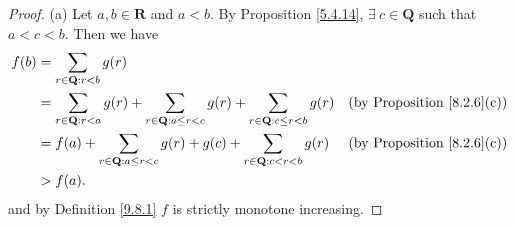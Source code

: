 \begin{proof}{(a)}
    Let \(a, b \in \mathbf{R}\) and \(a < b\).
    By Proposition \ref{5.4.14}, \(\exists\ c \in \mathbf{Q}\) such that \(a < c < b\).
    Then we have
    \begin{align*}
        f(b) & = \sum_{r \in \mathbf{Q} : r < b} g(r)                                                                                                                                      \\
             & = \sum_{r \in \mathbf{Q} : r < a} g(r) + \sum_{r \in \mathbf{Q} : a \leq r < c} g(r) + \sum_{r \in \mathbf{Q} : c \leq r < b} g(r) & \text{(by Proposition \ref{8.2.6}(c))} \\
             & = f(a) + \sum_{r \in \mathbf{Q} : a \leq r < c} g(r) + g(c) + \sum_{r \in \mathbf{Q} : c < r < b} g(r)                             & \text{(by Proposition \ref{8.2.6}(c))} \\
             & > f(a).
    \end{align*}
    and by Definition \ref{9.8.1} \(f\) is strictly monotone increasing.
\end{proof}

